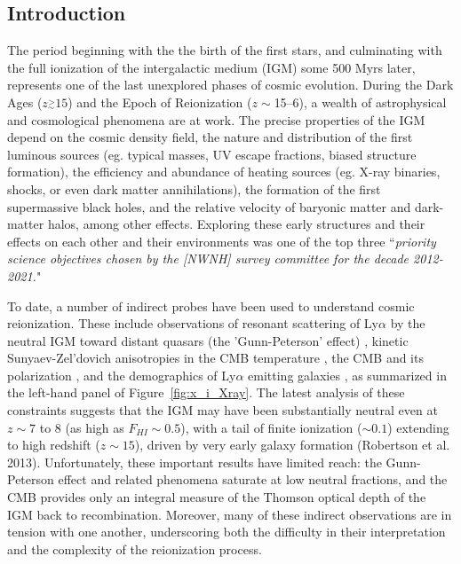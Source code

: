 \documentclass[preprint]{aastex}
\newcommand{\simgt}{\stackrel{>}{_{\sim}}}
\begin{document}
\subsection{Introduction}    %


The period beginning with the the birth of the first stars, and culminating with the full
ionization of the intergalactic medium (IGM) some 500 Myrs later, 
represents one of the last unexplored phases of cosmic evolution. During the Dark Ages
($z\simgt15$) and the Epoch of Reionization ($z\sim$15--6), a wealth
of astrophysical and cosmological phenomena are at work. The precise
properties of the IGM depend on the cosmic density field, the nature
and distribution of the first luminous sources (eg. typical masses, UV
escape fractions, biased structure formation), the efficiency and
abundance of heating sources (eg. X-ray binaries, shocks, or even dark
matter annihilations), the formation of the first supermassive black
holes, and the relative velocity of baryonic matter and dark-matter
halos, among other effects.  Exploring these early structures and
their effects on each other and their environments was one of the top
three ``{\it priority science objectives chosen by the [NWNH] survey
committee for the decade 2012-2021.}"

To date, a number of indirect probes have been used to understand
cosmic reionization. These include observations of resonant scattering
of Ly$\alpha$ by the neutral IGM toward distant quasars (the
'Gunn-Peterson' effect) \citep{fan_et_al2006}, kinetic
Sunyaev-Zel'dovich anisotropies in the CMB temperature
\citep{zahn_et_al2012_trunc}, the CMB \citep{planck_et_al2013} and its
polarization \citep{page_et_al2007}, and the demographics of
Ly$\alpha$ emitting galaxies \citep{treu_et_al2013}, as summarized in
the left-hand panel of Figure~\ref{fig:x_i_Xray}. The latest analysis
of these constraints suggests that the IGM may have been substantially
neutral even at $z \sim 7$ to 8 (as high as $F_{HI} \sim 0.5$), with
a tail of finite ionization ($\sim 0.1$) extending to high redshift
($z \sim 15$), driven by very early galaxy formation (Robertson et
al. 2013).  Unfortunately, these important results have limited
reach: the Gunn-Peterson effect and related phenomena saturate at low
neutral fractions, and the CMB provides only an integral measure of
the Thomson optical depth of the IGM back to recombination. Moreover,
many of these indirect observations are in tension with one another,
underscoring both the difficulty in their interpretation and the
complexity of the reionization process.
\end{document}
